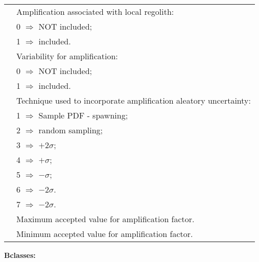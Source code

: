 \documentclass[a4paper, 12pt]{report}
\begin{document}
\begin{supertabular}{lp{0.6\textwidth}}
  &  Amplification associated with local regolith: \\
 & \hspace{0.5em} 0 $\Rightarrow$ NOT included; \\
 & \hspace{0.5em}  1 $\Rightarrow$ included. \\
    &   Variability for amplification: \\
 & \hspace{0.5em} 0 $\Rightarrow$ NOT included; \\
 & \hspace{0.5em} 1 $\Rightarrow$ included.  \\
 & Technique used to incorporate amplification aleatory uncertainty: \\
 & \hspace{0.5em} 1 $\Rightarrow$ Sample PDF - spawning; \\
 & \hspace{0.5em} 2 $\Rightarrow$ random sampling; \\
 & \hspace{0.5em} 3 $\Rightarrow$ $+2\sigma$; \\
 & \hspace{0.5em} 4 $\Rightarrow$ $+\sigma$; \\
 & \hspace{0.5em} 5 $\Rightarrow$ $-\sigma$; \\
 & \hspace{0.5em} 6 $\Rightarrow$ $-2\sigma$.\\
 & \hspace{0.5em} 7 $\Rightarrow$ $-2\sigma$.\\
    &   Maximum accepted value for amplification factor.   \\
    &   Minimum accepted value for amplification factor.    \\
 \end{supertabular}


\vspace{2em} \noindent \textbf{Bclasses:}
\end{document}
